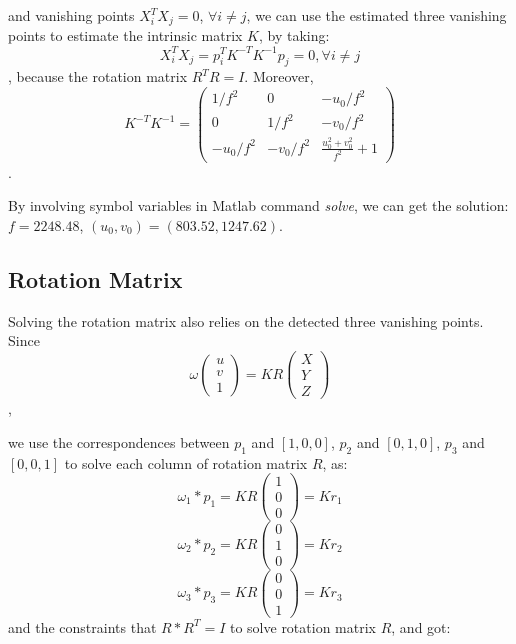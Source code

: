 \documentclass[11pt]{article}
\newcommand{\Z}{\mathbb{Z}}
\begin{document}
and vanishing points $X_i^T X_j = 0$, $\forall i \neq j$, we can use the estimated three vanishing points to estimate the intrinsic matrix $K$, by taking:
\[
X_i^T X_j = p_i^T K^{-T} K^{-1} p_j = 0,\text{} \forall i\neq j
\], 
because the rotation matrix $R^T R = I$. Moreover, 
\[
K^{-T} K^{-1} = \left( \begin{array}{ccc}
1/f^2       &       0       & -u_0/f^2 \\
0           & 1/f^2         & -v_0/f^2 \\
-u_0/f^2    & -v_0/f^2      & \frac{u_0^2+v_0^2}{f^2} + 1  
\end{array} \right)
\]. 

By involving symbol variables in Matlab command \emph{solve}, we can get the solution:
$f = 2248.48$, $(u_0, v_0) = (803.52, 1247.62)$.

\subsection{Rotation Matrix}
Solving the rotation matrix also relies on the detected three vanishing points. Since
\[
\omega \left( \begin{array}{c} u\\v\\1 \end{array} \right) = K R \left( \begin{array}{c} X\\Y\\Z \end{array} \right)
\], 

we use the correspondences between $p_1$ and $[1, 0, 0]$, $p_2$ and $[0, 1, 0]$, $p_3$ and $[0, 0, 1]$ to solve each column of rotation matrix $R$, as:
\[
\omega_1 * p_1 = KR \left( \begin{array}{c} 1\\0\\0 \end{array} \right) = Kr_1
\]
\[
\omega_2 * p_2 = KR \left( \begin{array}{c} 0\\1\\0 \end{array} \right) = Kr_2
\]
\[
\omega_3 * p_3 = KR \left( \begin{array}{c} 0\\0\\1 \end{array} \right) = Kr_3
\]
and the constraints that $R * R^T = I$ to solve rotation matrix $R$, and got:
\end{document}
